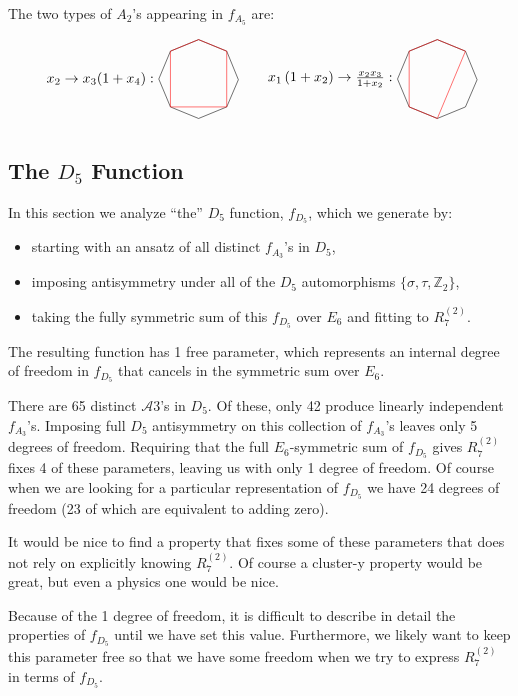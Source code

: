 \documentclass[11pt]{article}
\def\a{\mathcal{A}}
\def\pdfeq#1{\texorpdfstring{$#1$}{a}}
\def\fd5{f_{D_5}}
\def\fa3{f_{A_3}}
\def\drawOctagon{
\coordinate (P1) at (45:1);
\coordinate (P2) at (90:1);
\coordinate (P3) at (135:1);
\coordinate (P4) at (180:1);
\coordinate (P5) at (225:1);
\coordinate (P6) at (270:1);
\coordinate (P7) at (315:1);
\coordinate (P8) at (359:1);
\draw (P1) -- (P2) -- (P3) -- (P4) -- (P5) -- (P6) -- (P7) -- (P8) -- cycle;
}
\begin{document}
The two types of $A_2$'s appearing in $f_{A_5}$ are:

\begin{equation}
\begin{tikzpicture}
\drawOctagon
\draw[color=red] (P1) -- (P2) -- (P3) -- (P5) -- (P7) -- cycle;
\node[anchor=east] at (-1,0) (a) {$x_2 \to x_3(1+x_4):$};
\begin{scope}[xshift=6cm]
\drawOctagon
\node[anchor=east] at (-1,0) (a) {$x_1 \left(1+x_2\right)\to \frac{x_2x_3}{1+x_2}:$};
\draw[color=red] (P1) -- (P2) -- (P3) -- (P5) -- (P6) -- cycle;
\end{scope}
\end{tikzpicture}
\end{equation}

\subsection{The \pdfeq{D_5} Function}\label{sec:d5-func}

In this section we analyze ``the'' $D_5$ function, $\fd5$, which we generate by:
\begin{itemize}
	\item starting with an ansatz of all distinct $\fa3$'s in $D_5$,
	\item imposing antisymmetry under all of the $D_5$ automorphisms $\{\sigma, \tau, \mathbb{Z}_2\}$,
	\item taking the fully symmetric sum of this $\fd5$ over $E_6$ and fitting to $R^{(2)}_7$.
\end{itemize}
The resulting function has 1 free parameter, which represents an internal degree of freedom in $\fd5$ that cancels in the symmetric sum over $E_6$.

There are 65 distinct $\a3$'s in $D_5$. Of these, only 42 produce linearly independent $\fa3$'s. Imposing full $D_5$ antisymmetry on this collection of $\fa3$'s leaves only 5 degrees of freedom. Requiring that the full $E_6$-symmetric sum of $\fd5$ gives $R^{(2)}_7$ fixes 4 of these parameters, leaving us with only 1 degree of freedom. Of course when we are looking for a particular representation of $\fd5$ we have 24 degrees of freedom (23 of which are equivalent to adding zero).

It would be nice to find a property that fixes some of these parameters that does not rely on explicitly knowing $R^{(2)}_7$. Of course a cluster-y property would be great, but even a physics one would be nice. 

Because of the 1 degree of freedom, it is difficult to describe in detail the properties of $\fd5$ until we have set this value. Furthermore, we likely want to keep this parameter free so that we have some freedom when we try to express $R^{(2)}_7$ in terms of $\fd5$. 
\end{document}
